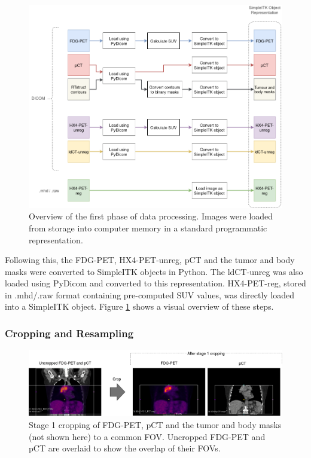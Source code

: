 \begin{figure}[h!]
    \centering
    \includegraphics[width=0.9\linewidth]{figures/Data/data_processing_overview-step_1.png}
    \caption{Overview of the first phase of data processing. Images were loaded from storage into computer memory in a standard programmatic representation.}
    \label{fig:data_proc_overview_1}
\end{figure}

Following this, the FDG-PET, HX4-PET-unreg, pCT and the tumor and body masks were converted to SimpleITK objects in Python. The ldCT-unreg was also loaded using PyDicom and converted to this representation. HX4-PET-reg, stored in .mhd/.raw format containing pre-computed SUV values, was directly loaded into a SimpleITK object. Figure \ref{fig:data_proc_overview_1} shows a visual overview of these steps.


\subsubsection{Cropping and Resampling}
\label{data_proc_phase_2}

\begin{figure}[h!]
    \centering
    \includegraphics[width=\linewidth]{figures/Data/fdgpet_pct_crop1/N010-FDG_PET_pCT-uncropped_crop1.png}
    \caption{Stage 1 cropping of FDG-PET, pCT and the tumor and body masks (not shown here) to a common FOV. Uncropped FDG-PET and pCT are overlaid to show the overlap of their FOVs.}
    \label{fig:fdg_pet_pct_crop1}
\end{figure}

